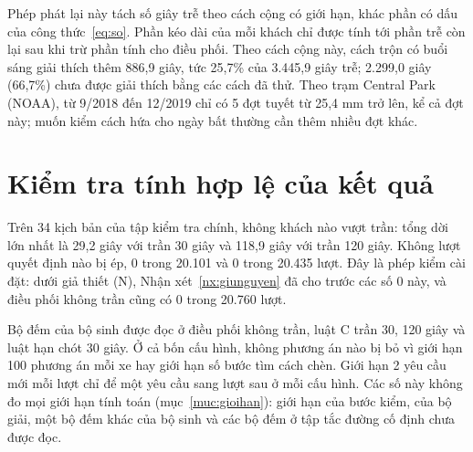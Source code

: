 Phép phát lại này tách số giây trễ theo cách cộng có giới hạn, khác phần có dấu của công thức~\eqref{eq:so}. Phần kéo
dài của mỗi khách chỉ được tính tới phần trễ còn lại sau khi trừ phần tính cho điều phối. Theo cách cộng này, cách trộn
có buổi sáng giải thích thêm 886,9 giây, tức 25,7\% của 3.445,9 giây trễ; 2.299,0 giây (66,7\%) chưa được giải thích
bằng các cách đã thử. Theo trạm Central Park (NOAA), từ 9/2018 đến 12/2019 chỉ có 5 đợt tuyết từ 25,4 mm trở lên, kể
cả đợt này; muốn kiểm cách hứa cho ngày bất thường cần thêm nhiều đợt khác.

\section{Kiểm tra tính hợp lệ của kết quả}
\label{muc:c4-hople}

Trên 34 kịch bản của tập kiểm tra chính, không khách nào vượt trần: tổng dời lớn nhất là 29,2 giây với trần 30 giây và
118,9 giây với trần 120 giây. Không lượt quyết định nào bị ép, 0 trong 20.101 và 0 trong 20.435 lượt. Đây là phép kiểm cài
đặt: dưới giả thiết (N), Nhận xét~\ref{nx:giunguyen} đã cho trước các số 0 này, và điều phối không trần cũng có 0
trong 20.760 lượt.

Bộ đếm của bộ sinh được đọc ở điều phối không trần, luật C trần 30, 120 giây và luật hạn chót 30 giây. Ở cả bốn cấu
hình, không phương án nào bị bỏ vì giới hạn 100 phương án mỗi xe hay giới hạn số bước tìm cách chèn. Giới hạn 2 yêu cầu
mới mỗi lượt chỉ để một yêu cầu sang lượt sau ở mỗi cấu hình. Các số này không đo mọi giới hạn tính toán (mục~\ref{muc:gioihan}): giới hạn
của bước kiểm, của bộ giải, một bộ đếm khác của bộ sinh và các bộ đếm ở tập tắc đường cố định chưa được đọc.


